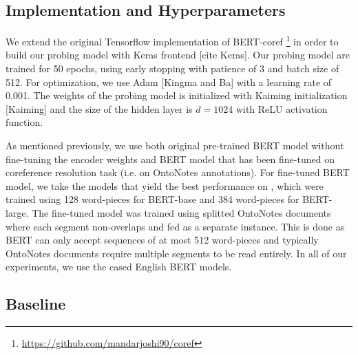 \documentclass[11pt]{article}
\begin{document}
\subsection{Implementation and Hyperparameters} 

We extend the original Tensorflow implementation of BERT-coref \footnote{\url{https://github.com/mandarjoshi90/coref}} in order to build our probing model with Keras frontend [cite Keras]. Our probing model are trained for 50 epochs, using early stopping with patience of 3 and batch size of 512. For optimization, we use Adam [Kingma and Ba] with a learning rate of 0.001. The weights of the probing model is initialized with Kaiming initialization [Kaiming] and the size of the hidden layer is $d=1024$ with ReLU activation function.

As mentioned previously, we use both original pre-trained BERT model without fine-tuning the encoder weights and BERT model that has been fine-tuned on coreference resolution task (i.e. on OntoNotes annotations). For fine-tuned BERT model, we take the models that yield the best performance on \parencite{joshi2019coref}, which were trained using 128 word-pieces for BERT-base and 384 word-pieces for BERT-large. The fine-tuned model was trained using splitted OntoNotes documents where each segment non-overlaps and fed as a separate instance. This is done as BERT can only accept sequences of at most 512 word-pieces and typically OntoNotes documents require multiple segments to be read entirely. In all of our experiments, we use the cased English BERT models.

\subsection{Baseline}
\end{document}

